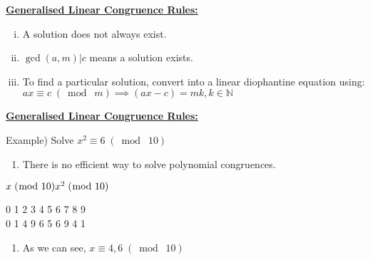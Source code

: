 \documentclass{letter}
\begin{document}
	\vspace{0.25 in}
				
	\underline{\textbf{Generalised Linear Congruence Rules:}}
	\vspace{0.25 in}
	
	\begin{enumerate}[i)]
		\item A solution does not always exist.
		\item $\gcd(a, m) \vert c$ means a solution exists.
		\item To find a particular solution, convert into a linear diophantine equation using:\\
		$ax \equiv c\;(\bmod\; m) \implies (ax- c) = mk, k \in \mathbb{N}$
	\end{enumerate}
	
	\vspace{0.25 in}
					
	\underline{\textbf{Generalised Linear Congruence Rules:}}
	\vspace{0.25 in}
		
	Example) Solve $x^2 \equiv 6\;(\bmod\; 10)$\\	
	\begin{enumerate}[-]
		\item There is no efficient way to solve polynomial congruences.
	\end{enumerate}
	
	\begin{minipage}[t]{0.2\textwidth}
		\begin{math}
		 	x\;(\bmod\; 10)\\
		  	x^2\;(\bmod\; 10)
		\end{math}
	\end{minipage}
	\begin{minipage}[t]{0.8\textwidth}
		\begin{text}
			0 1 2 3 4 5 6 7 8 9\\
			0 1 4 9 6 5 6 9 4 1
		\end{text}
	\end{minipage}
	
	\begin{enumerate}[-]
		\item As we can see, $x \equiv 4, 6 \;(\bmod\;  10)$
	\end{enumerate}	
\end{document}
